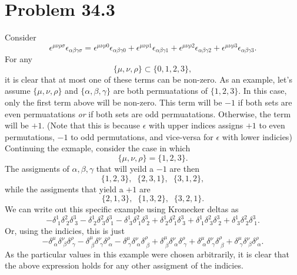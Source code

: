\documentclass[12pt]{article}
\begin{document}
\section*{Problem 34.3}
Consider
\[ \epsilon^{\mu\nu\rho\sigma}\epsilon_{\alpha\beta\gamma\sigma} = \epsilon^{\mu\nu\rho 0}\epsilon_{\alpha\beta\gamma 0} + \epsilon^{\mu\nu\rho 1}\epsilon_{\alpha\beta\gamma 1} + \epsilon^{\mu\nu\rho 2}\epsilon_{\alpha\beta\gamma 2} + \epsilon^{\mu\nu\rho 3}\epsilon_{\alpha\beta\gamma 3}. \]
For any 
\[ \{\mu, \nu, \rho\} \subset \{0, 1, 2, 3\}, \]
it is clear that at most one of these terms can be non-zero. As an example, let's assume $\{\mu, \nu, \rho\}$ and $\{\alpha, \beta, \gamma\}$ are both permuatations of $\{1, 2, 3\}$. In this case, only the first term above will be non-zero. This term will be $-1$ if both sets are even permuatations \textit{or} if both sets are odd permuatations. Otherwise, the term will be $+1$. (Note that this is because $\epsilon$ with upper indices assigns $+1$ to even permutations, $-1$ to odd permutations, and vice-versa for $\epsilon$ with lower indicies) Continuing the exmaple, consider the case in which 
\[ \{\mu, \nu, \rho\} = \{1, 2, 3\}. \]
The assigments of ${\alpha, \beta, \gamma}$ that will yeild a $-1$ are then
\[ \{1,2,3\}, \;\; \{2,3,1\}, \;\; \{3,1,2\}, \]
while the assigments that yield a $+1$ are
\[ \{2,1,3\}, \;\; \{1,3,2\}, \;\; \{3,2,1\}. \]
We can write out this specific example using Kronecker deltas as
\[ -\delta_{\;1}^{1}\delta_{\;2}^{2}\delta_{\;3}^{3} - \delta_{\;2}^{1}\delta_{\;3}^{2}\delta_{\;1}^{3} - \delta_{\;3}^{1}\delta_{\;1}^{2}\delta_{\;2}^{3} + \delta_{\;2}^{1}\delta_{\;1}^{2}\delta_{\;3}^{3} + \delta_{\;1}^{1}\delta_{\;3}^{2}\delta_{\;2}^{3} + \delta_{\;3}^{1}\delta_{\;2}^{2}\delta_{\;1}^{3}. \]
Or, using the indicies, this is just
\[ -\delta_{\;\alpha}^{\mu}\delta_{\;\beta}^{\nu}\delta_{\;\gamma}^{\rho} - \delta_{\;\beta}^{\mu}\delta_{\;\gamma}^{\nu}\delta_{\;\alpha}^{\rho} - \delta_{\;\gamma}^{\mu}\delta_{\;\alpha}^{\nu}\delta_{\;\beta}^{\rho} + \delta_{\;\beta}^{\mu}\delta_{\;\alpha}^{\nu}\delta_{\;\gamma}^{\rho} + \delta_{\;\alpha}^{\mu}\delta_{\;\gamma}^{\nu}\delta_{\;\beta}^{\rho} + \delta_{\;\gamma}^{\mu}\delta_{\;\beta}^{\nu}\delta_{\;\alpha}^{\rho}. \]
As the particular values in this example were chosen arbitrarily, it is clear that the above expression holds for any other assigment of the indicies. \\
\end{document}
